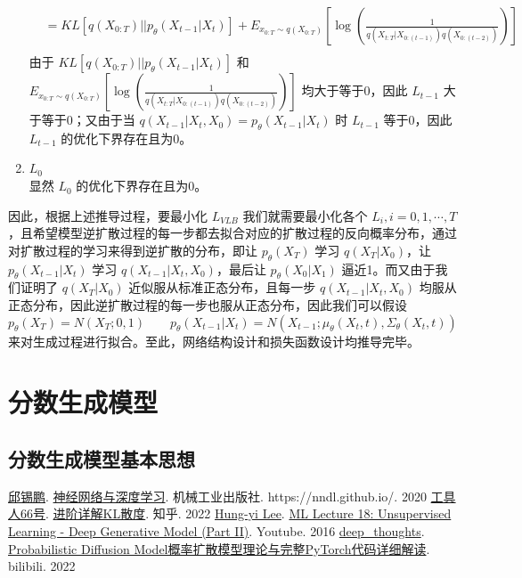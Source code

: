 \documentclass[12pt,a4paper,UTF8]{article}
\begin{document}
\begin{enumerate}
\[\begin{aligned}
&=KL\left[q\left(X_{0:T}\right)||p_{\theta}\left(X_{t-1}|X_t\right)\right]+E_{x_{0:T}\sim q\left(X_{0:T}\right)}\left[\log\left(\frac{1}{q\left(X_{t:T}|X_{0:\left(t-1\right)}\right)q\left(X_{0:\left(t-2\right)}\right)}\right)\right]\\
\end{aligned}\]
由于 $KL\left[q\left(X_{0:T}\right)||p_{\theta}\left(X_{t-1}|X_t\right)\right]$ 和 $E_{x_{0:T}\sim q\left(X_{0:T}\right)}\left[\log\left(\frac{1}{q\left(X_{t:T}|X_{0:\left(t-1\right)}\right)q\left(X_{0:\left(t-2\right)}\right)}\right)\right]$ 均大于等于0，因此 $L_{t-1}$ 大于等于0；又由于当 $q\left(X_{t-1}|X_t,X_0\right)=p_{\theta}\left(X_{t-1}|X_t\right)$ 时 $L_{t-1}$ 等于0，因此 $L_{t-1}$ 的优化下界存在且为0。
\item $L_0$\\
显然 $L_0$ 的优化下界存在且为0。
\end{enumerate}

\indent 因此，根据上述推导过程，要最小化 $L_{VLB}$ 我们就需要最小化各个 $L_i,i=0,1,\cdots,T$，且希望模型逆扩散过程的每一步都去拟合对应的扩散过程的反向概率分布，通过对扩散过程的学习来得到逆扩散的分布，即让 $p_{\theta}\left(X_T\right)$ 学习 $q\left(X_T|X_0\right)$，让 $p_{\theta}\left(X_{t-1}|X_t\right)$ 学习 $q\left(X_{t-1}|X_t,X_0\right)$，最后让 $p_{\theta}\left(X_0|X_1\right)$ 逼近1。而又由于我们证明了 $q\left(X_T|X_0\right)$ 近似服从标准正态分布，且每一步 $q\left(X_{t-1}|X_t,X_0\right)$ 均服从正态分布，因此逆扩散过程的每一步也服从正态分布，因此我们可以假设
\[p_{\theta}\left(X_T\right)=N\left(X_T;0,1\right)\qquad p_{\theta}\left(X_{t-1}|X_t\right)=N\left(X_{t-1};\mu_{\theta}\left(X_t,t\right),\Sigma_{\theta}\left(X_t,t\right)\right)\]
来对生成过程进行拟合。至此，网络结构设计和损失函数设计均推导完毕。


\section{分数生成模型}
\subsection{分数生成模型基本思想}



\newpage
\begin{thebibliography}{99}
\href{https://xpqiu.github.io/}{邱锡鹏}. \href{https://nndl.github.io/}{神经网络与深度学习}. 机械工业出版社. https://nndl.github.io/. 2020
\href{https://www.zhihu.com/people/adv-adj}{工具人66号}. \href{https://zhuanlan.zhihu.com/p/372835186}{进阶详解KL散度}. 知乎. 2022
\href{https://www.youtube.com/c/HungyiLeeNTU}{Hung-yi Lee}. \href{https://www.youtube.com/watch?v=8zomhgKrsmQ&list=PLJV_el3uVTsPy9oCRY30oBPNLCo89yu49&index=27}{ML Lecture 18: Unsupervised Learning - Deep Generative Model (Part II)}. Youtube. 2016
\href{https://space.bilibili.com/373596439}{deep\_thoughts}. \href{https://www.bilibili.com/video/BV1b541197HX?vd_source=e1a23aab8211cd62864bd7e4ee217986}{Probabilistic Diffusion Model概率扩散模型理论与完整PyTorch代码详细解读}. bilibili. 2022
\end{thebibliography}
\end{document}
